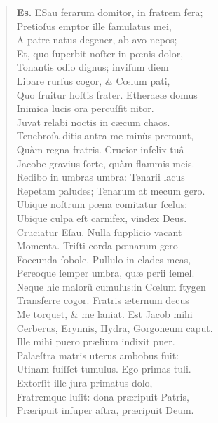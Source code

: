 \documentclass[a4paper,12pt]{article}
\begin{document}
\begin{verse}
\textbf{Es.}  ESau ferarum domitor, in fratrem fera;\\[0pt]
Pretioſus emptor ille famulatus mei,\\[0pt]
A patre natus degener, ab avo nepos;\\[0pt]
Et, quo ſuperbit noſter in pœnis dolor,\\[0pt]
Tonantis odio dignus; inviſum diem\\[0pt]
Libare rurſus cogor, \& Cœlum pati,\\[0pt]
Quo fruitur hoſtis frater. Etheraeæ domus\\[0pt]
Inimica lucis ora percuſfit nitor.\\[0pt]
Juvat relabi noctis in cæcum chaos.\\[0pt]
Tenebroſa ditis antra me minùs premunt,\\[0pt]
Quàm regna fratris. Crucior infelix tuâ\\[0pt]
Jacobe gravius ſorte, quàm flammis meis.\\[0pt]
Redibo in umbras umbra: Tenarii lacus\\[0pt]
Repetam paludes; Tenarum at mecum gero.\\[0pt]
Ubique noſtrum pœna comitatur ſcelus:\\[0pt]
Ubique culpa eſt carnifex, vindex Deus.\\[0pt]
Cruciatur Eſau. Nulla ſupplicio vacant\\[0pt]
Momenta. Triſti corda pœnarum gero\\[0pt]
Foecunda ſobole. Pullulo in clades meas,\\[0pt]
Pereoque ſemper umbra, quæ perii ſemel.\\[0pt]
Neque hic malorũ cumulus:in Cœlum ſtygen\\[0pt]
Transferre cogor. Fratris æternum decus\\[0pt]
Me torquet, \& me laniat. Est Jacob mihi\\[0pt]
Cerberus, Erynnis, Hydra, Gorgoneum caput.\\[0pt]
Ille mihi puero prælium indixit puer.\\[0pt]
Palaeſtra matris uterus ambobus fuit:\\[0pt]
Utinam fuiſſet tumulus. Ego primas tuli.\\[0pt]
Extorſit ille jura primatus dolo,\\[0pt]
Fratremque luſit: dona præripuit Patris,\\[0pt]
Præripuit inſuper aſtra, præripuit Deum.\\[0pt]

\end{verse}
\end{document}
